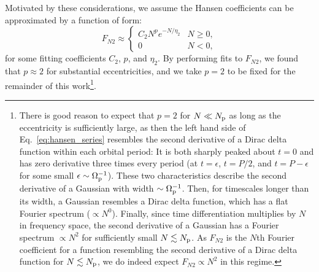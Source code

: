 \documentclass[
        fleqn,
        usenatbib,
    ]{mnras}
\begin{document}
Motivated by these considerations, we assume the Hansen coefficients can be
approximated by a function of form:
\begin{equation}
    F_{N2} \approx
    \begin{cases}
        C_2 N^{p}e^{-N/\eta_2} & N \geq 0,\\
        0 & N < 0,
    \end{cases}\label{eq:fn2_fit}
\end{equation}
for some fitting coefficients $C_2$, $p$, and $\eta_2$. By performing fits to
$F_{N2}$, we found that $p \approx 2$ for substantial
eccentricities, and we take $p = 2$ to be fixed for the remainder of this
work\footnote{There is good reason to expect that $p = 2$ for $N \ll N_{\rm p}$
as long as the eccentricity is sufficiently large, as then the left hand side of
Eq.~\eqref{eq:hansen_series} resembles the second derivative of a Dirac delta
function within each orbital period: It is both sharply peaked about $t = 0$ and
has zero derivative three times every period (at $t = \epsilon$, $t = P / 2$,
and $t = P - \epsilon$ for some small $\epsilon \sim \Omega_{\rm p}^{-1}$).
These two characteristics describe the second derivative of a Gaussian with
width $\sim \Omega_{\rm p}^{-1}$. Then, for timescales longer than its width, a
Gaussian resembles a Dirac delta function, which has a flat Fourier spectrum
($\propto N^0$). Finally, since time differentiation multiplies by $N$ in
frequency space, the second derivative of a Gaussian has a Fourier spectrum
$\propto N^2$ for sufficiently small $N \lesssim N_{\rm p}$. As $F_{N2}$ is the
$N$th Fourier coefficient for a function resembling the second derivative of a
Dirac delta function for $N \lesssim N_{\rm p}$, we do indeed expect $F_{N2}
\propto N^2$ in this regime.}.
\end{document}
